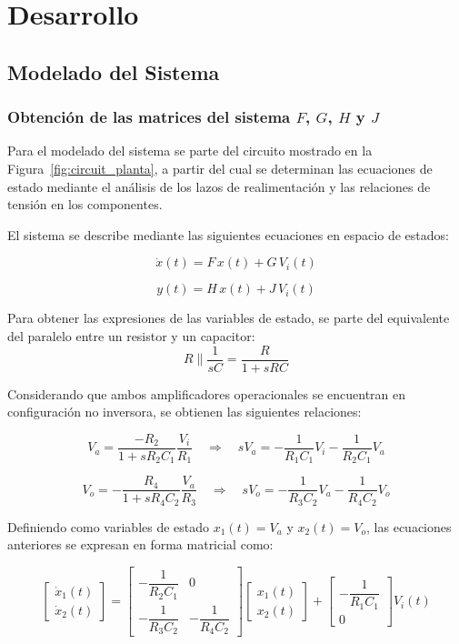 \section{Desarrollo}

\subsection{Modelado del Sistema}

\subsubsection{Obtención de las matrices del sistema $F$, $G$, $H$ y $J$}

Para el modelado del sistema se parte del circuito mostrado en la Figura~\ref{fig:circuit_planta}, a partir del cual se determinan las ecuaciones de estado mediante el análisis de los lazos de realimentación y las relaciones de tensión en los componentes.


El sistema se describe mediante las siguientes ecuaciones en espacio de estados:

\begin{equation}
	\dot{x}(t) = F\,x(t) + G\,V_i(t)
	\label{eq:1}
\end{equation}

\begin{equation}
	y(t) = H\,x(t) + J\,V_i(t)
	\label{eq:2}
\end{equation}

Para obtener las expresiones de las variables de estado, se parte del equivalente del paralelo entre un resistor y un capacitor:
\[
R \parallel \frac{1}{sC} = \frac{R}{1 + sRC}
\]

Considerando que ambos amplificadores operacionales se encuentran en configuración no inversora, se obtienen las siguientes relaciones:

\[
V_a = \frac{-R_2}{1 + sR_2C_1}\frac{V_i}{R_1}
\quad \Rightarrow \quad
sV_a = -\frac{1}{R_1C_1}V_i - \frac{1}{R_2C_1}V_a
\]

\[
V_o = -\frac{R_4}{1 + sR_4C_2}\frac{V_a}{R_3}
\quad \Rightarrow \quad
sV_o = -\frac{1}{R_3C_2}V_a - \frac{1}{R_4C_2}V_o
\]

Definiendo como variables de estado $x_1(t) = V_a$ y $x_2(t) = V_o$, las ecuaciones anteriores se expresan en forma matricial como:

\[
\begin{bmatrix}
	\dot{x}_1(t) \\[4pt]
	\dot{x}_2(t)
\end{bmatrix}
=
\begin{bmatrix}
	-\dfrac{1}{R_2C_1} & 0 \\[4pt]
	-\dfrac{1}{R_3C_2} & -\dfrac{1}{R_4C_2}
\end{bmatrix}
\begin{bmatrix}
	x_1(t) \\[4pt]
	x_2(t)
\end{bmatrix}
+
\begin{bmatrix}
	-\dfrac{1}{R_1C_1} \\[4pt]
	0
\end{bmatrix}
V_i(t)
\]

